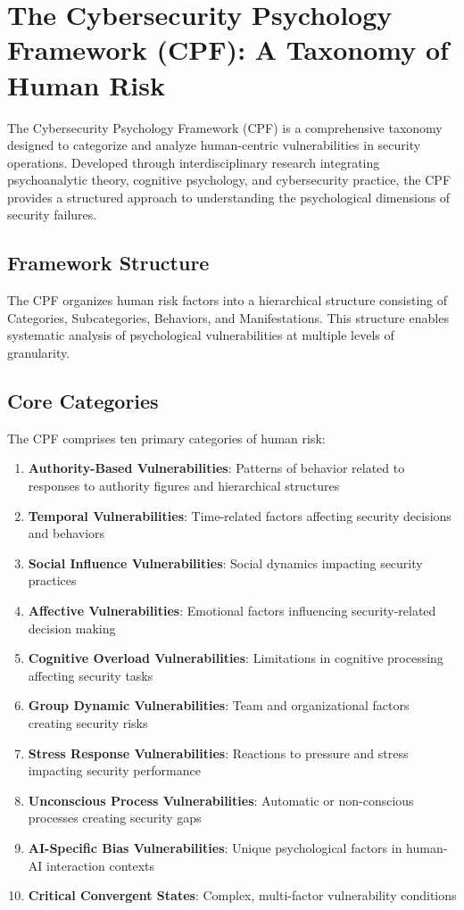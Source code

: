 \documentclass[11pt, a4paper]{article}
\begin{document}
\section{The Cybersecurity Psychology Framework (CPF): A Taxonomy of Human Risk}
\label{sec:cpf_taxonomy}

The Cybersecurity Psychology Framework (CPF) is a comprehensive taxonomy designed to categorize and analyze human-centric vulnerabilities in security operations. Developed through interdisciplinary research integrating psychoanalytic theory, cognitive psychology, and cybersecurity practice, the CPF provides a structured approach to understanding the psychological dimensions of security failures.

\subsection{Framework Structure}
The CPF organizes human risk factors into a hierarchical structure consisting of Categories, Subcategories, Behaviors, and Manifestations. This structure enables systematic analysis of psychological vulnerabilities at multiple levels of granularity.

\subsection{Core Categories}
The CPF comprises ten primary categories of human risk:

\begin{enumerate}
\item \textbf{Authority-Based Vulnerabilities}: Patterns of behavior related to responses to authority figures and hierarchical structures
\item \textbf{Temporal Vulnerabilities}: Time-related factors affecting security decisions and behaviors
\item \textbf{Social Influence Vulnerabilities}: Social dynamics impacting security practices
\item \textbf{Affective Vulnerabilities}: Emotional factors influencing security-related decision making
\item \textbf{Cognitive Overload Vulnerabilities}: Limitations in cognitive processing affecting security tasks
\item \textbf{Group Dynamic Vulnerabilities}: Team and organizational factors creating security risks
\item \textbf{Stress Response Vulnerabilities}: Reactions to pressure and stress impacting security performance
\item \textbf{Unconscious Process Vulnerabilities}: Automatic or non-conscious processes creating security gaps
\item \textbf{AI-Specific Bias Vulnerabilities}: Unique psychological factors in human-AI interaction contexts
\item \textbf{Critical Convergent States}: Complex, multi-factor vulnerability conditions
\end{enumerate}
\end{document}
